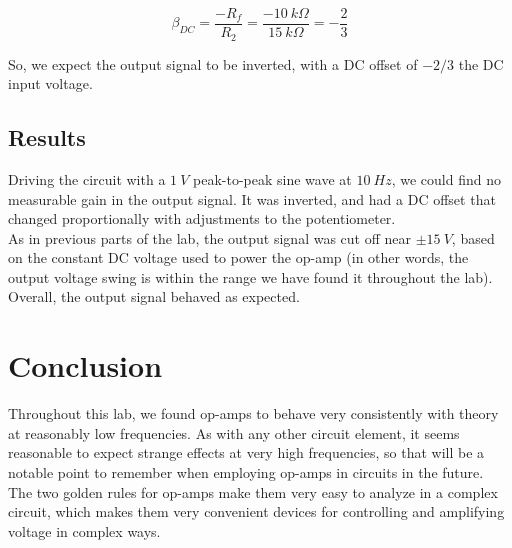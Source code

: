 \documentclass[11pt]{article}
\begin{document}
\begin{equation}
    \beta_{DC} = \frac{-R_f}{R_2} = \frac{-10\ k \Omega}{15\ k \Omega} = - \frac{2}{3}
\end{equation}

So, we expect the output signal to be inverted, with a DC offset of $-2/3$ the DC input voltage.\\


\subsection{Results}

Driving the circuit with a $1\ V$ peak-to-peak sine wave at $10\ Hz$, we could find no measurable gain in the output signal. It was inverted, and had a DC offset that changed proportionally with adjustments to the potentiometer.\\

As in previous parts of the lab, the output signal was cut off near $\pm 15\ V$, based on the constant DC voltage used to power the op-amp (in other words, the output voltage swing is within the range we have found it throughout the lab). Overall, the output signal behaved as expected.\\


\section{Conclusion}

Throughout this lab, we found op-amps to behave very consistently with theory at reasonably low frequencies. As with any other circuit element, it seems reasonable to expect strange effects at very high frequencies, so that will be a notable point to remember when employing op-amps in circuits in the future.\\

The two golden rules for op-amps make them very easy to analyze in a complex circuit, which makes them very convenient devices for controlling and amplifying voltage in complex ways.\\
\end{document}
